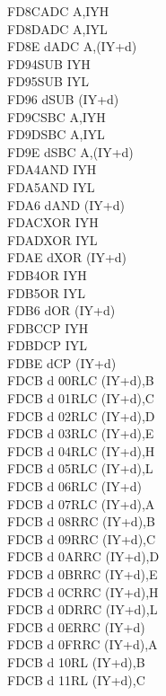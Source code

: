 \begin{multicols}{3}
{\begin{tabbing}
	FD8C\>ADC A,IYH\UNDOC\\
	FD8D\>ADC A,IYL\UNDOC\\
	FD8E d\>ADC A,(IY+d)\\
	FD94\>SUB IYH\UNDOC\\
	FD95\>SUB IYL\UNDOC\\
	FD96 d\>SUB (IY+d)\\
	FD9C\>SBC A,IYH\UNDOC\\
	FD9D\>SBC A,IYL\UNDOC\\
	FD9E d\>SBC A,(IY+d)\\
	FDA4\>AND IYH\UNDOC\\
	FDA5\>AND IYL\UNDOC\\
	FDA6 d\>AND (IY+d)\\
	FDAC\>XOR IYH\UNDOC\\
	FDAD\>XOR IYL\UNDOC\\
	FDAE d\>XOR (IY+d)\\
	FDB4\>OR IYH\UNDOC\\
	FDB5\>OR IYL\UNDOC\\
	FDB6 d\>OR (IY+d)\\
	FDBC\>CP IYH\UNDOC\\
	FDBD\>CP IYL\UNDOC\\
	FDBE d\>CP (IY+d)\\
	FDCB d 00\>RLC (IY+d),B\UNDOC\\
	FDCB d 01\>RLC (IY+d),C\UNDOC\\
	FDCB d 02\>RLC (IY+d),D\UNDOC\\
	FDCB d 03\>RLC (IY+d),E\UNDOC\\
	FDCB d 04\>RLC (IY+d),H\UNDOC\\
	FDCB d 05\>RLC (IY+d),L\UNDOC\\
	FDCB d 06\>RLC (IY+d)\\
	FDCB d 07\>RLC (IY+d),A\UNDOC\\
	FDCB d 08\>RRC (IY+d),B\UNDOC\\
	FDCB d 09\>RRC (IY+d),C\UNDOC\\
	FDCB d 0A\>RRC (IY+d),D\UNDOC\\
	FDCB d 0B\>RRC (IY+d),E\UNDOC\\
	FDCB d 0C\>RRC (IY+d),H\UNDOC\\
	FDCB d 0D\>RRC (IY+d),L\UNDOC\\
	FDCB d 0E\>RRC (IY+d)\\
	FDCB d 0F\>RRC (IY+d),A\UNDOC\\
	FDCB d 10\>RL (IY+d),B\UNDOC\\
	FDCB d 11\>RL (IY+d),C\UNDOC\\

\end{tabbing}}
\end{multicols}
